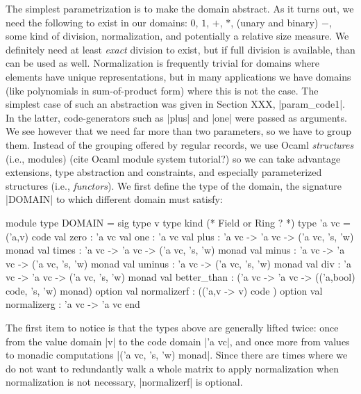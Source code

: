 \documentclass{llncs}
\begin{document}
The simplest parametrization is to make the domain abstract. As it 
turns out, we need the following to exist in our domains:  $0$, $1$,
$+$, $*$, (unary and binary) $-$, some kind of division, normalization,
and potentially a relative size measure.  We definitely need at least
\emph{exact} division to exist, but if full division is available, than
can be used as well.  Normalization is frequently trivial for domains
where elements have unique representations, but in many applications
we have domains (like polynomials in sum-of-product form) where this
is not the case.  The simplest case of such an abstraction was given
in Section XXX, |param_code1|. In the latter, code-generators such as
|plus| and |one| were passed as arguments. We see however that we 
need far more than two parameters, so we have to group them. Instead
of the grouping offered by regular records, we use Ocaml
\emph{structures} (i.e., modules) (cite Ocaml module system tutorial?)
so we can take advantage extensions, type abstraction and constraints,
and especially parameterized structures (i.e., \emph{functors}).
We first define the type of the domain, the signature |DOMAIN| to which
different domain must satisfy:
\begin{small}
\begin{code}
module type DOMAIN = sig
  type v
  type kind (* Field or Ring ? *)
  type 'a vc = ('a,v) code
  val zero : 'a vc
  val one : 'a vc
  val plus : 'a vc -> 'a vc -> ('a vc, 's, 'w) monad
  val times : 'a vc -> 'a vc -> ('a vc, 's, 'w) monad
  val minus : 'a vc -> 'a vc -> ('a vc, 's, 'w) monad
  val uminus : 'a vc -> ('a vc, 's, 'w) monad
  val div : 'a vc -> 'a vc -> ('a vc, 's, 'w) monad
  val better_than : ('a vc -> 'a vc -> 
      (('a,bool) code, 's, 'w) monad) option
  val normalizerf : (('a,v -> v) code ) option
  val normalizerg : 'a vc -> 'a vc
end 
\end{code}
\end{small}
\noindent  The first item to notice is that the types above are
generally lifted twice: once from the value domain |v| to the code
domain |'a vc|, and once more from values to monadic computations
|('a vc, 's, 'w) monad|.  Since there are times where we do not want
to redundantly walk a whole matrix to apply normalization when 
normalization is not necessary, |normalizerf| is optional.
\end{document}
